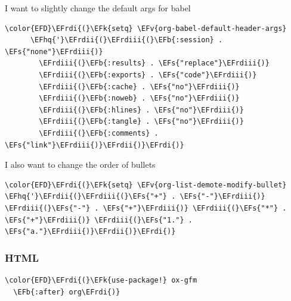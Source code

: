 \documentclass{scrartcl}
\newcommand{\EFk}[1]{\textcolor{EFk}{#1}} %
\newcommand{\EFs}[1]{\textcolor{EFs}{#1}} %
\newcommand{\EFb}[1]{\textcolor{EFb}{#1}} %
\newcommand{\EFv}[1]{\textcolor{EFv}{#1}} %
\newcommand{\EFhq}[1]{#1} %
\newcommand{\EFrdi}[1]{#1} %
\newcommand{\EFrdii}[1]{#1} %
\newcommand{\EFrdiii}[1]{#1} %
\begin{document}
I want to slightly change the default args for babel
\begin{Code}
\begin{Verbatim}[]
\color{EFD}\EFrdi{(}\EFk{setq} \EFv{org-babel-default-header-args}
      \EFhq{'}\EFrdii{(}\EFrdiii{(}\EFb{:session} . \EFs{"none"}\EFrdiii{)}
        \EFrdiii{(}\EFb{:results} . \EFs{"replace"}\EFrdiii{)}
        \EFrdiii{(}\EFb{:exports} . \EFs{"code"}\EFrdiii{)}
        \EFrdiii{(}\EFb{:cache} . \EFs{"no"}\EFrdiii{)}
        \EFrdiii{(}\EFb{:noweb} . \EFs{"no"}\EFrdiii{)}
        \EFrdiii{(}\EFb{:hlines} . \EFs{"no"}\EFrdiii{)}
        \EFrdiii{(}\EFb{:tangle} . \EFs{"no"}\EFrdiii{)}
        \EFrdiii{(}\EFb{:comments} . \EFs{"link"}\EFrdiii{)}\EFrdii{)}\EFrdi{)}
\end{Verbatim}
\end{Code}

I also want to change the order of bullets
\begin{Code}
\begin{Verbatim}[]
\color{EFD}\EFrdi{(}\EFk{setq} \EFv{org-list-demote-modify-bullet} \EFhq{'}\EFrdii{(}\EFrdiii{(}\EFs{"+"} . \EFs{"-"}\EFrdiii{)} \EFrdiii{(}\EFs{"-"} . \EFs{"+"}\EFrdiii{)} \EFrdiii{(}\EFs{"*"} . \EFs{"+"}\EFrdiii{)} \EFrdiii{(}\EFs{"1."} . \EFs{"a."}\EFrdiii{)}\EFrdii{)}\EFrdi{)}
\end{Verbatim}
\end{Code}

\subsubsection{HTML}
\label{sec:org1ca457f}
\begin{Code}
\begin{Verbatim}[]
\color{EFD}\EFrdi{(}\EFk{use-package!} ox-gfm
  \EFb{:after} org\EFrdi{)}
\end{Verbatim}
\end{Code}
\end{document}
